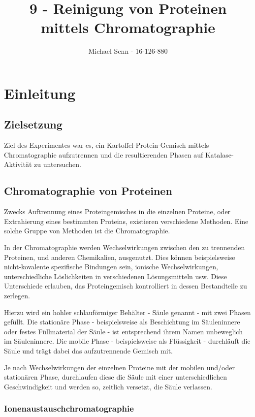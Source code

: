 \documentclass[a4paper,german]{scrreprt}
\title{9 - Reinigung von Proteinen mittels Chromatographie}
\author{Michael Senn \maillink{michael.senn@students.unibe.ch} - 16-126-880}
\date{\printdate}
\begin{document}
\maketitle

\chapter{Einleitung}

\section{Zielsetzung}

Ziel des Experimentes war es, ein Kartoffel-Protein-Gemisch mittels
Chromatographie aufzutrennen und die resultierenden Phasen auf
Katalase-Aktivität zu untersuchen.

\section{Chromatographie von Proteinen}

Zwecks Auftrennung eines Proteingemisches in die einzelnen Proteine, oder
Extrahierung eines bestimmten Proteins, existieren verschiedene Methoden. Eine
solche Gruppe von Methoden ist die Chromatographie.

In der Chromatographie werden Wechselwirkungen zwischen den zu trennenden
Proteinen, und anderen Chemikalien, ausgenutzt. Dies können beispielsweise
nicht-kovalente spezifische Bindungen sein, ionische Wechselwirkungen,
unterschiedliche Löslichkeiten in verschiedenen Lösungsmitteln usw. Diese
Unterschiede erlauben, das Proteingemisch kontrolliert in dessen Bestandteile
zu zerlegen.

Hierzu wird ein hohler schlauförmiger Behälter - Säule genannt - mit zwei
Phasen gefüllt. Die stationäre Phase - beispielsweise als Beschichtung im
Säuleninnere oder festes Füllmaterial der Säule - ist entsprechend ihrem Namen
unbeweglich im Säuleninnere. Die mobile Phase - beispielsweise als Flüssigkeit
- durchläuft die Säule und trägt dabei das aufzutrennende Gemisch mit.

Je nach Wechselwirkungen der einzelnen Proteine mit der mobilen und/oder
stationären Phase, durchlaufen diese die Säule mit einer unterschiedlichen
Geschwindigkeit und werden so, zeitlich versetzt, die Säule verlassen.

\subsection{Ionenaustauschchromatographie}
\end{document}
